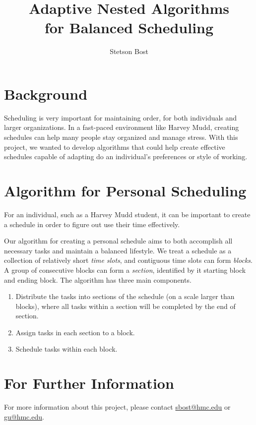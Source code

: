 \documentclass[thesis]{hmcposter}
\author{Stetson Bost}
\title{Adaptive Nested Algorithms\\for Balanced Scheduling}
\begin{document}
\begin{poster}

\section{Background}
Scheduling is very important for maintaining order, for both individuals and larger organizations.
In a fast-paced environment like Harvey Mudd, creating schedules can help many people stay organized and manage stress.
With this project, we wanted to develop algorithms that could help create effective schedules capable of adapting do an individual's preferences or style of working.

\section{Algorithm for Personal Scheduling}%

For an individual, such as a Harvey Mudd student, it can be important to create a schedule in order to figure out use their time effectively. 

Our algorithm for creating a personal schedule aims to both accomplish all necessary tasks and maintain a balanced lifestyle.
We treat a schedule as a collection of relatively short \emph{time slots}, and contiguous time slots can form \emph{blocks}.
A group of consecutive blocks can form a \emph{section}, identified by it starting block and ending block.
The algorithm has three main components.
\begin{enumerate}
	\item
		Distribute the tasks into sections of the schedule (on a scale larger than blocks), where all tasks within a section will be completed by the end of section.
	\item
		Assign tasks in each section to a block. 
	\item
		Schedule tasks within each block.
\end{enumerate}






\section{For Further Information}
For more information about this project, please contact \url{sbost@hmc.edu} or \url{gu@hmc.edu}.


\vfill
\columnbreak



\end{poster}
\end{document}
